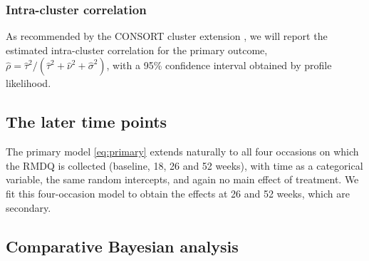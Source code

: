 \documentclass[11pt,a4paper]{article}
\begin{document}
\subsubsection{Intra-cluster correlation}

As recommended by the CONSORT cluster extension \citep{campbell2012,
adams2004}, we will report the estimated intra-cluster correlation for the
primary outcome, $\hat\rho = \hat\tau^2 / (\hat\tau^2 + \hat\nu^2 +
\hat\sigma^2)$, with a 95\% confidence interval obtained by profile
likelihood.

\subsection{The later time points}

The primary model \eqref{eq:primary} extends naturally to all four occasions
on which the RMDQ is collected (baseline, 18, 26 and 52 weeks), with time as
a categorical variable, the same random intercepts, and again no main effect
of treatment. We fit this four-occasion model to obtain the effects at 26 and
52 weeks, which are secondary.

\subsection{Comparative Bayesian analysis}
\label{sec:bayes}
\end{document}
